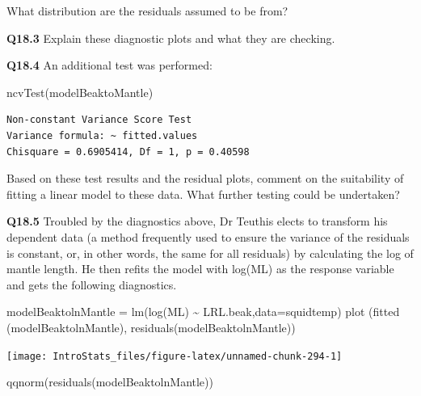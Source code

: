 \documentclass[
  oneside]{krantz}
\newenvironment{Shaded}{\begin{snugshade}}{\end{snugshade}}
\newcommand{\AttributeTok}[1]{\textcolor[rgb]{0.77,0.63,0.00}{#1}}
\newcommand{\FunctionTok}[1]{\textcolor[rgb]{0.00,0.00,0.00}{#1}}
\newcommand{\NormalTok}[1]{#1}
\newcommand{\OtherTok}[1]{\textcolor[rgb]{0.56,0.35,0.01}{#1}}
\newcommand{\SpecialCharTok}[1]{\textcolor[rgb]{0.00,0.00,0.00}{#1}}
\begin{document}
What distribution are the residuals assumed to be from?

\textbf{Q18.3} Explain these diagnostic plots and what they are checking.

\textbf{Q18.4} An additional test was performed:

\begin{Shaded}
\begin{Highlighting}[]
\FunctionTok{ncvTest}\NormalTok{(modelBeaktoMantle)}
\end{Highlighting}
\end{Shaded}

\begin{verbatim}
Non-constant Variance Score Test 
Variance formula: ~ fitted.values 
Chisquare = 0.6905414, Df = 1, p = 0.40598
\end{verbatim}

Based on these test results and the residual plots, comment on the suitability of fitting a linear model to these data. What further testing could be
undertaken?

\newpage

\textbf{Q18.5} Troubled by the diagnostics above, Dr Teuthis elects to transform his dependent data (a method frequently used to ensure the variance of the residuals is constant, or, in other words, the same for all residuals) by calculating the log of mantle length. He then refits the model with log(ML) as the response variable and gets the following diagnostics.

\begin{Shaded}
\begin{Highlighting}[]
\NormalTok{modelBeaktolnMantle }\OtherTok{=}  \FunctionTok{lm}\NormalTok{(}\FunctionTok{log}\NormalTok{(ML) }\SpecialCharTok{\textasciitilde{}}\NormalTok{ LRL.beak,}\AttributeTok{data=}\NormalTok{squidtemp)}
\FunctionTok{plot}\NormalTok{ (}\FunctionTok{fitted}\NormalTok{ (modelBeaktolnMantle), }\FunctionTok{residuals}\NormalTok{(modelBeaktolnMantle))}
\end{Highlighting}
\end{Shaded}

\begin{center}\texttt{[image: IntroStats\_files/figure-latex/unnamed-chunk-294-1]} \end{center}

\begin{Shaded}
\begin{Highlighting}[]
\FunctionTok{qqnorm}\NormalTok{(}\FunctionTok{residuals}\NormalTok{(modelBeaktolnMantle))}
\end{Highlighting}
\end{Shaded}
\end{document}
